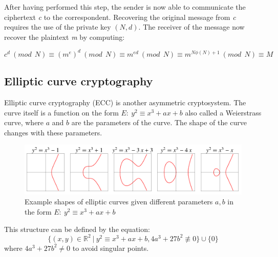 After having performed this step, the sender is now able to communicate the ciphertext \textit{c} to the correspondent. Recovering the original message from \textit{c} requires the use of the private key $(N,d)$.%
The receiver of the message now recover the plaintext \textit{m} by computing:



$$c^d ~(mod ~~ N)\equiv (m^e)^d ~(mod ~~ N)\equiv m^{ed} ~(mod ~~ N)\equiv m^{N \phi(N)+1} ~(mod ~~ N)\equiv M$$

\newpage

\subsection{Elliptic curve cryptography}
\label{elliptic}
Elliptic curve cryptography (ECC) is another asymmetric cryptosystem. The curve itself is a function on the form $E: ~ y^2 \equiv x^3+ax+b $ also called a Weierstrass curve, where $a$ and $b$ are the parameters of the curve\cite{elipticcurve}. The shape of the curve changes with these parameters. %
\begin{figure}[H]
    \centering
    \includegraphics[width=1.0\textwidth]{figures/elliptic-curve-example}
    \caption{Example shapes of elliptic curves given different parameters $a,b$ in the form  $E: ~ y^2 \equiv x^3+ax+b $}
\end{figure}
\noindent This structure can be defined by the equation:
$$\{(x,y) \in \mathbb{R}^{2} ~ | ~ y^2 \equiv x^3 +ax +b, 4a^3 + 27b^2 \not\equiv 0 \} \cup \{0\}$$
where $4a^3+27b^2 \neq 0$ to avoid singular points.

